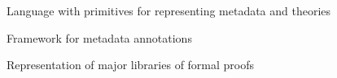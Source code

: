 \begin{workpackage}
\begin{tasklist}


\end{tasklist}


\begin{wpdelivs}
  \begin{wpdeliv}[due=18,id=deliv-str-framework,dissem=PU,nature=R,lead=Sac]
  	{Language with primitives for representing metadata and theories}
  \end{wpdeliv}
  \begin{wpdeliv}[due=36,id=deliv-str-ontology,dissem=PU,nature=R,lead=Sac]
  	{Framework for metadata annotations}
  \end{wpdeliv}
  \begin{wpdeliv}[due=48,id=deliv-str-libraries,dissem=PU,nature=R,lead=Fau]
  	{Representation of major libraries of formal proofs}
  \end{wpdeliv}
\end{wpdelivs}




\end{workpackage}
